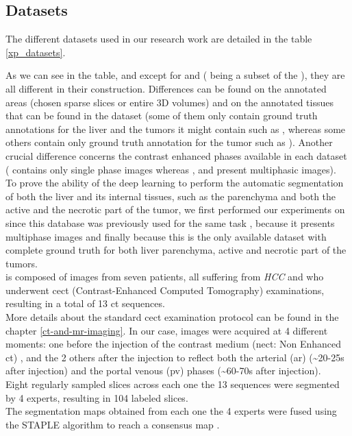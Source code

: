 \subsection{Datasets}

The different datasets used in our research work are detailed in the
table \ref{xp_datasets}.



As we can see in the table, and except for \textbf{} and \textbf{}
(\textbf{} being a subset of the \textbf{} \cite{Bilic2019}), they are all different in their construction. Differences can
be found on the annotated areas (chosen sparse slices or entire 3D
volumes) and on the annotated tissues that can be found in the dataset
(some of them only contain ground truth annotations for the liver and
the tumors it might contain such as \textbf{}, whereas some others contain
only ground truth annotation for the tumor such as \textbf{}). Another
crucial difference concerns the contrast enhanced phases available in
each dataset (\textbf{} contains only single phase images whereas \textbf{},
\textbf{} and \textbf{} present multiphasic images). \\
To prove the ability of the deep learning to perform the automatic
segmentation of both the liver and its internal tissues, such as the
parenchyma and both the active and the necrotic part of the tumor, we
first performed our experiments on \textbf{} since this database was
previously used for the same task \cite{Conze2017}, because it
presents multiphase images and finally because this is the only
available dataset with complete ground truth for both liver parenchyma,
active and necrotic part of the tumors. \\
\textbf{} is composed of images from seven patients, all suffering
from \emph{HCC} and who underwent \ac{cect} (Contrast-Enhanced
Computed Tomography) examinations, resulting in a total of 13 \ac{ct}
sequences. \\
More details about the standard \ac{cect} examination protocol can be
found in the chapter \ref{ct-and-mr-imaging}. In our case, images were acquired at 4 different
moments: one before the injection of the contrast medium (\ac{nect}:
Non Enhanced \ac{ct}) , and the 2 others after the injection to reflect both
the arterial (\ac{ar}) (\textasciitilde{}20-25s after injection) and
the portal venous (\ac{pv}) phases (\textasciitilde{}60-70s after
injection).\\
Eight regularly sampled slices across each one the 13 sequences were
segmented by 4 experts, resulting in 104 labeled slices. \\
The segmentation maps obtained from each one the 4 experts were fused
using the STAPLE algorithm to reach a consensus map \cite{Warfield2004}.


